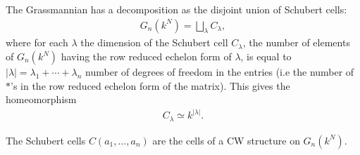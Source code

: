 \documentclass[a4paper,openany]{scrbook}
\begin{document}
The Grassmannian has a decomposition as the disjoint union of 	Schubert cells:
\begin{align*}
\displaystyle G_n(k^N) = \bigsqcup_{\lambda} C_{\lambda},
\end{align*} \noindent
where for each $\lambda$ the dimension of the Schubert cell $C_\lambda$, the number of elements of $G_n(k^N)$ having the row reduced echelon form of $\lambda$, is equal to $|\lambda| = \lambda_1 + \cdots + \lambda_n$ number of degrees of freedom in the entries (i.e the number of $*$'s in the row reduced echelon form of the matrix). This gives the  homeomorphism 
\begin{align}
\label{schubertcellaffine}
C_{\lambda} \simeq k^{|\lambda|}.
\end{align} \noindent 
\begin{prop}\label{prop:GrassmannianCWstructure}
The Schubert cells $C(a_1,\dots ,a_n)$ are the cells of a CW structure on $G_n(k^N)$.
\end{prop}
\end{document}
